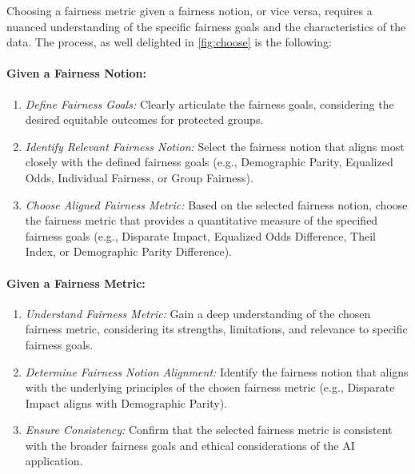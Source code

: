 Choosing a fairness metric given a fairness notion, or vice versa, requires a nuanced understanding of the specific fairness goals and the characteristics of the data. The process, as well delighted in \cref{fig:choose} is the following:

\paragraph{Given a Fairness Notion:}

\begin{enumerate}
 
    \item \emph{Define Fairness Goals:} Clearly articulate the fairness goals, considering the desired equitable outcomes for protected groups.
 
    \item \emph{Identify Relevant Fairness Notion:} Select the fairness notion that aligns most closely with the defined fairness goals (e.g., Demographic Parity, Equalized Odds, Individual Fairness, or Group Fairness).
 
    \item \emph{Choose Aligned Fairness Metric:} Based on the selected fairness notion, choose the fairness metric that provides a quantitative measure of the specified fairness goals (e.g., Disparate Impact, Equalized Odds Difference, Theil Index, or Demographic Parity Difference).

\end{enumerate}

\paragraph{Given a Fairness Metric:}

\begin{enumerate}

    \item \emph{Understand Fairness Metric:} Gain a deep understanding of the chosen fairness metric, considering its strengths, limitations, and relevance to specific fairness goals.

    \item \emph{Determine Fairness Notion Alignment:} Identify the fairness notion that aligns with the underlying principles of the chosen fairness metric (e.g., Disparate Impact aligns with Demographic Parity).
 
    \item \emph{Ensure Consistency:} Confirm that the selected fairness metric is consistent with the broader fairness goals and ethical considerations of the AI application.

\end{enumerate}

